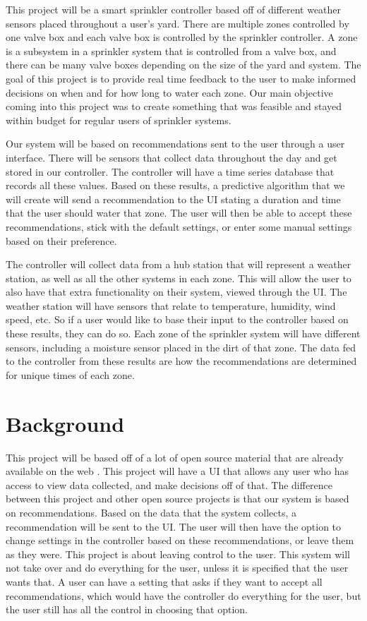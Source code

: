 \documentclass[letterpaper, 10 pt, conference]{ieeeconf}  %
\begin{document}
This project will be a smart sprinkler controller based off of different weather sensors placed throughout a user's yard. There are multiple zones controlled by one valve box and each valve box is controlled by the sprinkler controller. A zone is a subsystem in a sprinkler system that is controlled from a valve box, and there can be many valve boxes depending on the size of the yard and system. The goal of this project is to provide real time feedback to the user to make informed decisions on when and for how long to water each zone. Our main objective coming into this project was to create something that was feasible and stayed within budget for regular users of sprinkler systems.

Our system will be based on recommendations sent to the user through a user interface. There will be sensors that collect data throughout the day and get stored in our controller. The controller will have a time series database that records all these values. Based on these results, a predictive algorithm that we will create will send a recommendation to the UI stating a duration and time that the user should water that zone. The user will then be able to accept these recommendations, stick with the default settings, or enter some manual settings based on their preference. 

The controller will collect data from a hub station that will represent a weather station, as well as all the other systems in each zone. This will allow the user to also have that extra functionality on their system, viewed through the UI. The weather station will have sensors that relate to temperature, humidity, wind speed, etc. So if a user would like to base their input to the controller based on these results, they can do so. Each zone of the sprinkler system will have different sensors, including a moisture sensor placed in the dirt of that zone. The data fed to the controller from these results are how the recommendations are determined for unique times of each zone.


\section{Background}
This project will be based off of a lot of open source material that are already available on the web \cite{SIP}. This project will have a UI that allows any user who has access to view data collected, and make decisions off of that. The difference between this project and other open source projects is that our system is based on recommendations. Based on the data that the system collects, a recommendation will be sent to the UI. The user will then have the option to change settings in the controller based on these recommendations, or leave them as they were. This project is about leaving control to the user. This system will not take over and do everything for the user, unless it is specified that the user wants that. A user can have a setting that asks if they want to accept all recommendations, which would have the controller do everything for the user, but the user still has all the control in choosing that option. 
\end{document}
